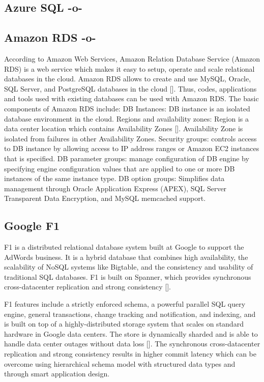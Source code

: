       
\subsection{Azure SQL -o-}



\subsection{Amazon RDS -o-}

According to Amazon Web Services, Amazon Relation Database Service
(Amazon RDS) is a web service which makes it easy to setup, operate
and scale relational databases in the cloud. Amazon RDS allows to
create and use MySQL, Oracle, SQL Server, and PostgreSQL databases in
the cloud [\cite{www-AmazonRDS}]. Thus, codes, applications and tools
used with existing databases can be used with Amazon RDS. The basic
components of Amazon RDS include: DB Instances: DB instance is an
isolated database environment in the cloud. Regions and availability
zones: Region is a data center location which contains Availability
Zones [\cite{www-AmazonRDSComponents}]. Availability Zone is isolated
from failures in other Availability Zones. Security groups: controls
access to DB instance by allowing access to IP address ranges or
Amazon EC2 instances that is specified. DB parameter groups: manage
configuration of DB engine by specifying engine configuration values
that are applied to one or more DB instances of the same instance
type. DB option groups: Simplifies data management through Oracle
Application Express (APEX), SQL Server Transparent Data Encryption,
and MySQL memcached support.



     
\subsection{Google F1}

F1 is a distributed relational database system built at Google to
support the AdWords business. It is a hybrid database that combines
high availability, the scalability of NoSQL systems like Bigtable, and
the consistency and usability of traditional SQL databases. F1 is
built on Spanner, which provides synchronous cross-datacenter
replication and strong consistency [\cite{paper-F1}].
     
F1 features include a strictly enforced schema, a powerful parallel
SQL query engine, general transactions, change tracking and
notification, and indexing, and is built on top of a
highly-distributed storage system that scales on standard hardware in
Google data centers. The store is dynamically sharded and is able to
handle data center outages without data loss [\cite{paper-RDBMS}]. The
synchronous cross-datacenter replication and strong consistency
results in higher commit latency which can be overcome using
hierarchical schema model with structured data types and through smart
application design.
     

